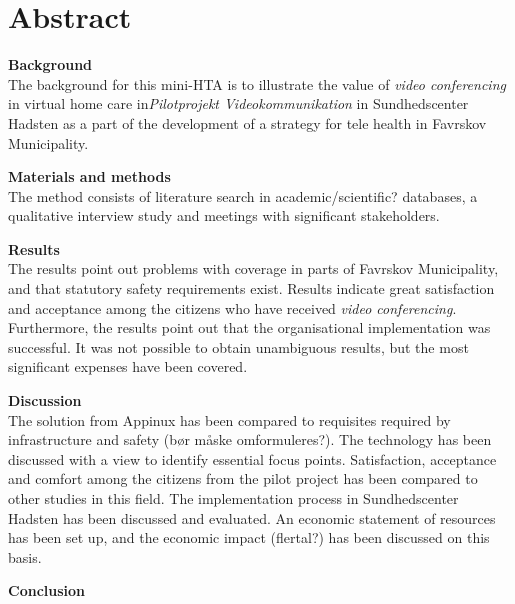 \chapter{Abstract}

\textbf{Background}\\
The background for this mini-HTA is to illustrate the value of \textit{video conferencing} in virtual home care in\textit{Pilotprojekt Videokommunikation} in Sundhedscenter Hadsten as a part of the development of a strategy for tele health in Favrskov Municipality.

\textbf{Materials and methods}\\
The method consists of literature search in academic/scientific? databases, a qualitative interview study and meetings with significant stakeholders.

\textbf{Results}\\
The results point out problems with coverage in parts of Favrskov Municipality, and that statutory safety requirements exist. Results indicate great satisfaction and acceptance among the citizens who have received \textit{video conferencing}. Furthermore, the results point out that the organisational implementation was successful. It was not possible to obtain unambiguous results, but the most significant expenses have been covered.

\textbf{Discussion}\\
The solution from Appinux has been compared to requisites required by infrastructure and safety (bør måske omformuleres?). The technology has been discussed with a view to identify essential focus points. Satisfaction, acceptance and comfort among the citizens from the pilot project has been compared to other studies in this field. The implementation process in Sundhedscenter Hadsten has been discussed and evaluated. An economic statement of resources has been set up, and the economic impact (flertal?) has been discussed on this basis.

\textbf{Conclusion}\\
